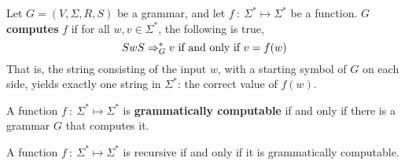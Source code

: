 \begin{definition}{}
Let $G = (V, \Sigma, R, S)$ be a grammar, and let $f\ :\ \Sigma^* \mapsto \Sigma^*$ be a function. $G$ \textbf{computes} $f$ if for all $w, v \in \Sigma^*$, the following is true,
\begin{equation*}
  SwS \Rightarrow_G^* v \textnormal{ if and only if } v = f(w)
\end{equation*}
That is, the string consisting of the input $w$, with a starting symbol of $G$ on each side, yields exactly one string in $\Sigma^*$: the correct value of $f(w)$. 

\quad A function $f\ :\ \Sigma^* \mapsto \Sigma^*$ is \textbf{grammatically computable} if and only if there is a grammar $G$ that computes it.
\end{definition}

\begin{theorem}{}
A function $f\ :\ \Sigma^* \mapsto \Sigma^*$ is recursive if and only if it is grammatically computable.
\end{theorem}

\vspace*{\fill}
\columnbreak
